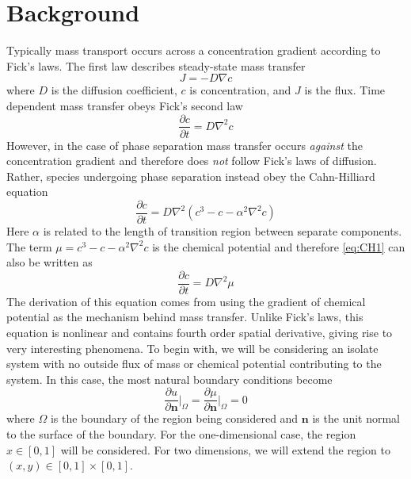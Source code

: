 \documentclass[]{article}
\theoremstyle{definition}
\numberwithin{equation}{section}
\numberwithin{equation}{section}
\begin{document}
	\section{Background}
	Typically mass transport occurs across a concentration gradient according to Fick's laws. The first law describes steady-state mass transfer
	\begin{equation}
		J = -D \nabla c 
	\end{equation}
	where $D$ is the diffusion coefficient, $c$ is concentration, and $J$ is the flux. Time dependent mass transfer obeys Fick's second law
	\begin{equation}
		\frac{\partial c}{\partial t} = D \nabla^2 c
	\end{equation}
	However, in the case of phase separation mass transfer occurs \textit{against} the concentration gradient and therefore does \textit{not} follow Fick's laws of diffusion. Rather, species undergoing phase separation instead obey the Cahn-Hilliard equation
	\begin{equation}
		\frac{\partial c}{\partial t} = D \nabla^2 (c^3 - c -\alpha^2 \nabla^2 c) \label{eq:CH1}
	\end{equation}
	Here $\alpha$ is related to the length of transition region between separate components. The term $\mu = c^3 - c - \alpha^2 \nabla^2 c$ is the chemical potential and therefore \eqref{eq:CH1} can also be written as
	\begin{equation}
		\frac{\partial c}{\partial t} = D \nabla^2 \mu \label{eq:CH2}
	\end{equation}
	The derivation of this equation comes from using the gradient of chemical potential as the mechanism behind mass transfer. Unlike Fick's laws, this equation is nonlinear and contains fourth order spatial derivative, giving rise to very interesting phenomena. To begin with, we will be considering an isolate system with no outside flux of mass or chemical potential contributing to the system. In this case, the most natural boundary conditions become
	\begin{equation}
		\frac{\partial u}{\partial \mathbf{n}}\bigg|_{\Omega} = \frac{\partial \mu}{\partial \mathbf{n}}\bigg|_{\Omega} = 0 \label{eq:CH3}
	\end{equation}
	where $\Omega$ is the boundary of the region being considered and $\mathbf{n}$ is the unit normal to the surface of the boundary. For the one-dimensional case, the region $x \in [0,1]$ will be considered. For two dimensions, we will extend the region to $(x,y) \in [0,1] \times [0,1]$.
\end{document}
